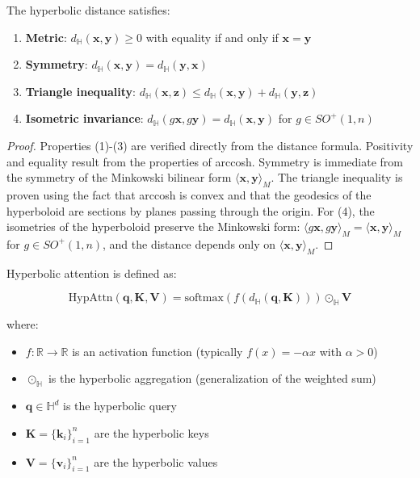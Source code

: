 \begin{theorem}\label{thm:propiedades_distancia_hiperbolica}
The hyperbolic distance satisfies:
\begin{enumerate}
    \item \textbf{Metric}: $d_{\mathbb{H}}(\mathbf{x}, \mathbf{y}) \geq 0$ with equality if and only if $\mathbf{x} = \mathbf{y}$
    \item \textbf{Symmetry}: $d_{\mathbb{H}}(\mathbf{x}, \mathbf{y}) = d_{\mathbb{H}}(\mathbf{y}, \mathbf{x})$
    \item \textbf{Triangle inequality}: $d_{\mathbb{H}}(\mathbf{x}, \mathbf{z}) \leq d_{\mathbb{H}}(\mathbf{x}, \mathbf{y}) + d_{\mathbb{H}}(\mathbf{y}, \mathbf{z})$
    \item \textbf{Isometric invariance}: $d_{\mathbb{H}}(g\mathbf{x}, g\mathbf{y}) = d_{\mathbb{H}}(\mathbf{x}, \mathbf{y})$ for $g \in SO^+(1,n)$
\end{enumerate}
\end{theorem}

\begin{proof}
Properties (1)-(3) are verified directly from the distance formula. Positivity and equality result from the properties of arccosh. Symmetry is immediate from the symmetry of the Minkowski bilinear form $\langle \mathbf{x}, \mathbf{y} \rangle_M$. The triangle inequality is proven using the fact that arccosh is convex and that the geodesics of the hyperboloid are sections by planes passing through the origin. For (4), the isometries of the hyperboloid preserve the Minkowski form: $\langle g\mathbf{x}, g\mathbf{y} \rangle_M = \langle \mathbf{x}, \mathbf{y} \rangle_M$ for $g \in SO^+(1,n)$, and the distance depends only on $\langle \mathbf{x}, \mathbf{y} \rangle_M$.
\end{proof}

\begin{definition}\label{def:atencion_hiperbolica}
Hyperbolic attention is defined as:

\begin{equation}
    \text{HypAttn}(\mathbf{q}, \mathbf{K}, \mathbf{V}) = \text{softmax}(f(d_{\mathbb{H}}(\mathbf{q}, \mathbf{K}))) \odot_{\mathbb{H}} \mathbf{V}
    \label{eq:hyperbolic_attention}
\end{equation}

where:
\begin{itemize}
    \item $f: \mathbb{R} \to \mathbb{R}$ is an activation function (typically $f(x) = -\alpha x$ with $\alpha > 0$)
    \item $\odot_{\mathbb{H}}$ is the hyperbolic aggregation (generalization of the weighted sum)
    \item $\mathbf{q} \in \mathbb{H}^d$ is the hyperbolic query
    \item $\mathbf{K} = \{\mathbf{k}_i\}_{i=1}^n$ are the hyperbolic keys
    \item $\mathbf{V} = \{\mathbf{v}_i\}_{i=1}^n$ are the hyperbolic values
\end{itemize}
\end{definition}

